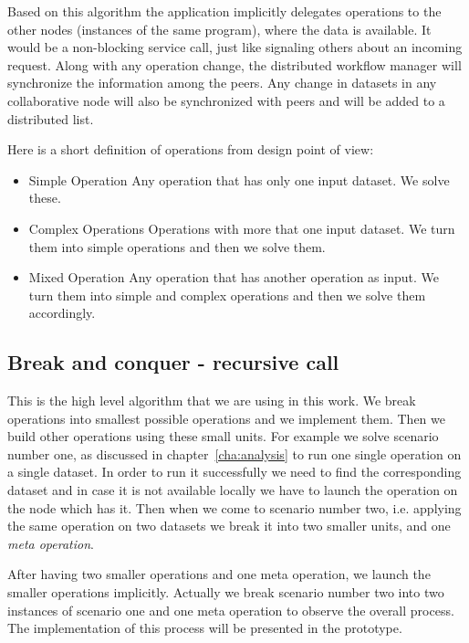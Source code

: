 Based on this algorithm the application implicitly delegates operations to the other 
nodes (instances of the same program), where the data is available. 
It would be a non-blocking service call, 
just like signaling others about an incoming request.
Along with any operation change, the distributed workflow manager will synchronize the information among the peers.
Any change in datasets in any collaborative node will also be synchronized with peers and will be added to 
a distributed list.

Here is a short definition of operations from design point of view:

\begin{itemize}
\item{Simple Operation} Any operation that has only one input dataset. We solve these.
\item{Complex Operations} Operations with more that one input dataset. We turn them into simple operations and then we solve them.
\item{Mixed Operation} Any operation that has another operation as input. We turn them into simple and complex operations and
then we solve them accordingly.
\end{itemize}

\subsection{Break and conquer - recursive call}
This is the high level algorithm that we are using in this work. We break operations into smallest possible operations
and we implement them. Then we build other operations using these small units. For example we solve scenario number one, as
discussed in chapter~\ref{cha:analysis} to run one single operation on a single dataset.
In order to run it successfully we need to find the corresponding dataset and in case it is not available locally we have
to launch the operation on the node which has it. Then when we come to scenario number two, i.e. applying the same operation
on two datasets we break it into two smaller units, and one \textit{meta operation}.

After having two smaller operations and one meta operation, we launch the smaller operations implicitly. Actually we break
scenario number two into two instances of scenario one and one meta operation to observe the overall process. The implementation
of this process will be presented in the prototype.

